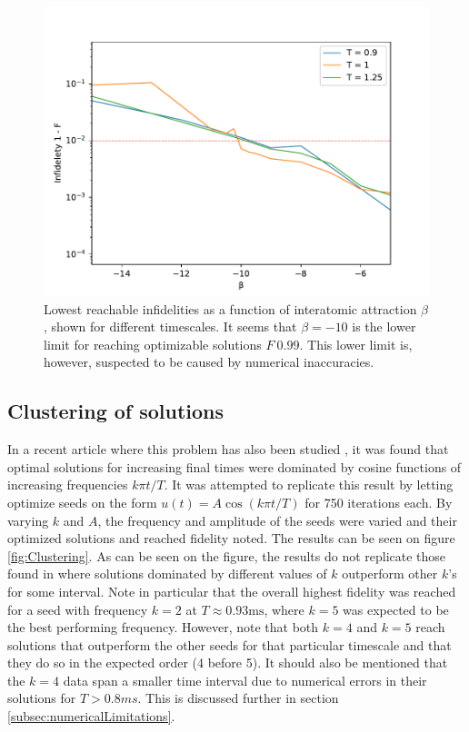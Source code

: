 \documentclass[aps,pra,reprint,superscriptaddress]{revtex4-1}
\begin{document}
\begin{figure}
	\includegraphics[width=\columnwidth]{graphics/reachable_neg_beta.pdf}
	\caption{Lowest reachable infidelities as a function of interatomic attraction $\beta$, shown for different timescales. It seems that $\beta=-10$ is the lower limit for reaching optimizable solutions $F~0.99$. This lower limit is, however, suspected to be caused by numerical inaccuracies.}
	\label{fig:reachable_neg_betas}
\end{figure} 

\subsection{\label{subsec:clustering}Clustering of solutions}
In a recent article where this problem has also been studied \cite{QM2Paper}, it was found that optimal solutions for increasing final times were dominated by cosine functions of increasing frequencies $k\pi t/T$. It was attempted to replicate this result by letting  optimize seeds on the form $u(t) = A\cos(k\pi t/T)$ for 750 iterations each. By varying $k$ and $A$, the frequency and amplitude of the seeds were varied and their optimized solutions and reached fidelity noted. The results can be seen on figure \ref{fig:Clustering}. As can be seen on the figure, the results do not replicate those found in \cite{QM2Paper} where solutions dominated by different values of $k$ outperform other $k$'s for some interval. Note in particular that the overall highest fidelity was reached for a seed with frequency $k=2$ at $T\approx 0.93 \text{ms}$, where $k=5$ was expected to be the best performing frequency. However, note that both $k=4$ and $k=5$ reach solutions that outperform the other seeds for that particular timescale and that they do so in the expected order (4 before 5). It should also be mentioned that the $k=4$ data span a smaller time interval due to numerical errors in their solutions for $T>0.8 ms$. This is discussed further in section \ref{subsec:numericalLimitations}. \\
\end{document}
